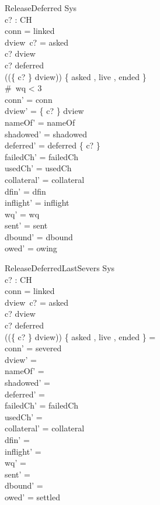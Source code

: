\documentclass[a4paper,10pt,fleqn]{article}
\begin{document}
\begin{schema}{ReleaseDeferred}
  \Delta Sys \\
  c? : CH \\
\where
  conn = linked \\
  dview~c? = asked \\
  c? \in \dom dview \\
  c? \in deferred \\
  (\ran (\{ c? \} \ndres dview)) \cap \{ asked , live , ended \} \neq \emptyset \\
  \#~wq < 3 \\
  conn' = conn \\
  dview' = \{ c? \} \ndres dview \\
  nameOf' = nameOf \\
  shadowed' = shadowed \\
  deferred' = deferred \setminus \{ c? \} \\
  failedCh' = failedCh \\
  usedCh' = usedCh \\
  collateral' = collateral \\
  dfin' = dfin \\
  inflight' = inflight \\
  wq' = wq \\
  sent' = sent \\
  dbound' = dbound \\
  owed' = owing
\end{schema}

\begin{schema}{ReleaseDeferredLastSevers}
  \Delta Sys \\
  c? : CH \\
\where
  conn = linked \\
  dview~c? = asked \\
  c? \in \dom dview \\
  c? \in deferred \\
  (\ran (\{ c? \} \ndres dview)) \cap \{ asked , live , ended \} = \emptyset \\
  conn' = severed \\
  dview' = \emptyset \\
  nameOf' = \emptyset \\
  shadowed' = \emptyset \\
  deferred' = \emptyset \\
  failedCh' = failedCh \\
  usedCh' = \emptyset \\
  collateral' = collateral \\
  dfin' = \emptyset \\
  inflight' = \langle \rangle \\
  wq' = \langle \rangle \\
  sent' = \langle \rangle \\
  dbound' = \emptyset \\
  owed' = settled
\end{schema}
\end{document}
